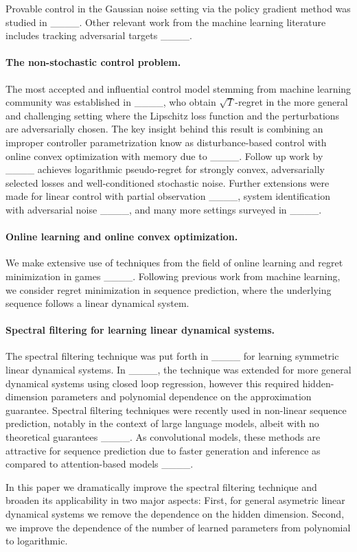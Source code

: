 Provable control in the Gaussian noise setting via the policy gradient method was  studied in ____. Other relevant work from the machine learning literature includes tracking adversarial targets ____.

\paragraph{The non-stochastic control problem.}

The most accepted and influential control model stemming from machine learning community was established in 
____, who obtain $\sqrt{T}$-regret in the more general and challenging setting where the Lipschitz loss function {and the perturbations } are adversarially chosen. The key insight behind this result is combining an improper controller parametrization know as disturbance-based control with  online convex optimization with memory due to ____. Follow up work by ____ achieves logarithmic pseudo-regret for strongly convex, adversarially selected losses and well-conditioned stochastic noise. Further extensions were made for linear control with partial observation ____, system identification with adversarial noise ____, and many more settings surveyed in ____. 


\paragraph{Online learning and online convex optimization.}
We make extensive use of techniques from the field of online learning and regret minimization in games ____. Following previous work from machine learning, we consider regret minimization in sequence prediction, where the underlying sequence follows a linear dynamical system.   

\paragraph{Spectral filtering for learning linear dynamical systems.}
The spectral filtering technique was put forth in ____ for learning symmetric linear dynamical systems. In ____, the technique was extended for more general dynamical systems using closed loop regression, however this required hidden-dimension parameters and polynomial dependence on the approximation guarantee. Spectral filtering techniques were recently used in non-linear sequence prediction, notably in the context of large language models, albeit with no theoretical guarantees ____. As convolutional models, these methods are attractive for sequence prediction due to faster generation and inference as compared to attention-based models ____.

In this paper we dramatically improve the spectral filtering technique and broaden its applicability in two major aspects: First, for general asymetric linear dynamical systems we remove the dependence on the hidden dimension. Second, we improve the dependence of the number of learned parameters from polynomial to logarithmic.   
    

%